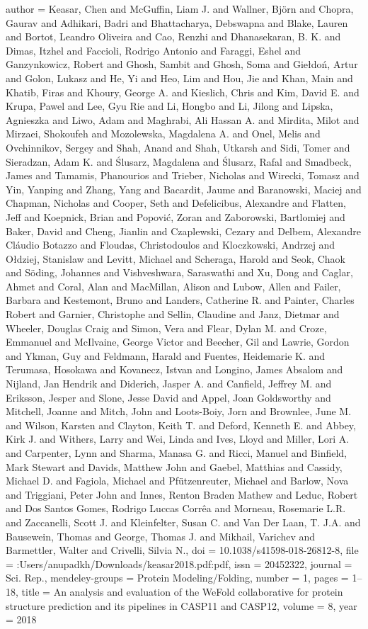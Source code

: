 {author = {Keasar, Chen and McGuffin, Liam J. and Wallner, Bj{\"{o}}rn and Chopra, Gaurav and Adhikari, Badri and Bhattacharya, Debswapna and Blake, Lauren and Bortot, Leandro Oliveira and Cao, Renzhi and Dhanasekaran, B. K. and Dimas, Itzhel and Faccioli, Rodrigo Antonio and Faraggi, Eshel and Ganzynkowicz, Robert and Ghosh, Sambit and Ghosh, Soma and Gie{\l}do{\'{n}}, Artur and Golon, Lukasz and He, Yi and Heo, Lim and Hou, Jie and Khan, Main and Khatib, Firas and Khoury, George A. and Kieslich, Chris and Kim, David E. and Krupa, Pawel and Lee, Gyu Rie and Li, Hongbo and Li, Jilong and Lipska, Agnieszka and Liwo, Adam and Maghrabi, Ali Hassan A. and Mirdita, Milot and Mirzaei, Shokoufeh and Mozolewska, Magdalena A. and Onel, Melis and Ovchinnikov, Sergey and Shah, Anand and Shah, Utkarsh and Sidi, Tomer and Sieradzan, Adam K. and {\'{S}}lusarz, Magdalena and {\'{S}}lusarz, Rafal and Smadbeck, James and Tamamis, Phanourios and Trieber, Nicholas and Wirecki, Tomasz and Yin, Yanping and Zhang, Yang and Bacardit, Jaume and Baranowski, Maciej and Chapman, Nicholas and Cooper, Seth and Defelicibus, Alexandre and Flatten, Jeff and Koepnick, Brian and Popovi{\'{c}}, Zoran and Zaborowski, Bartlomiej and Baker, David and Cheng, Jianlin and Czaplewski, Cezary and Delbem, Alexandre Cl{\'{a}}udio Botazzo and Floudas, Christodoulos and Kloczkowski, Andrzej and O{\l}dziej, Stanislaw and Levitt, Michael and Scheraga, Harold and Seok, Chaok and S{\"{o}}ding, Johannes and Vishveshwara, Saraswathi and Xu, Dong and Caglar, Ahmet and Coral, Alan and MacMillan, Alison and Lubow, Allen and Failer, Barbara and Kestemont, Bruno and Landers, Catherine R. and Painter, Charles Robert and Garnier, Christophe and Sellin, Claudine and Janz, Dietmar and Wheeler, Douglas Craig and Simon, Vera and Flear, Dylan M. and Croze, Emmanuel and McIlvaine, George Victor and Beecher, Gil and Lawrie, Gordon and Ykman, Guy and Feldmann, Harald and Fuentes, Heidemarie K. and Terumasa, Hosokawa and Kovanecz, Istvan and Longino, James Absalom and Nijland, Jan Hendrik and Diderich, Jasper A. and Canfield, Jeffrey M. and Eriksson, Jesper and Slone, Jesse David and Appel, Joan Goldsworthy and Mitchell, Joanne and Mitch, John and Loots-Boiy, Jorn and Brownlee, June M. and Wilson, Karsten and Clayton, Keith T. and Deford, Kenneth E. and Abbey, Kirk J. and Withers, Larry and Wei, Linda and Ives, Lloyd and Miller, Lori A. and Carpenter, Lynn and Sharma, Manasa G. and Ricci, Manuel and Binfield, Mark Stewart and Davids, Matthew John and Gaebel, Matthias and Cassidy, Michael D. and Fagiola, Michael and Pf{\"{u}}tzenreuter, Michael and Barlow, Nova and Triggiani, Peter John and Innes, Renton Braden Mathew and Leduc, Robert and {Dos Santos Gomes}, Rodrigo Luccas Corr{\^{e}}a and Morneau, Rosemarie L.R. and Zaccanelli, Scott J. and Kleinfelter, Susan C. and {Van Der Laan}, T. J.A. and Bausewein, Thomas and George, Thomas J. and Mikhail, Varichev and Barmettler, Walter and Crivelli, Silvia N.},
doi = {10.1038/s41598-018-26812-8},
file = {:Users/anupadkh/Downloads/keasar2018.pdf:pdf},
issn = {20452322},
journal = {Sci. Rep.},
mendeley-groups = {Protein Modeling/Folding},
number = {1},
pages = {1--18},
title = {{An analysis and evaluation of the WeFold collaborative for protein structure prediction and its pipelines in CASP11 and CASP12}},
volume = {8},
year = {2018}
}
